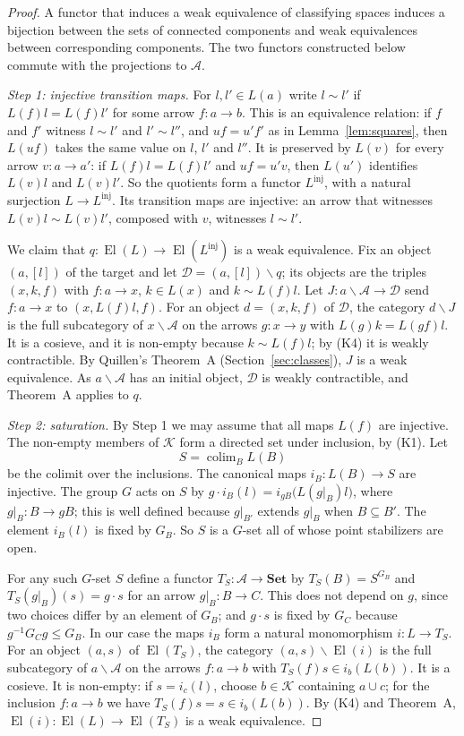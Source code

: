 \documentclass[11pt,a4paper]{article}
\theoremstyle{definition}
\newcommand{\El}{\operatorname{El}}
\newcommand{\colim}{\operatorname{colim}}
\newcommand{\Set}{\mathbf{Set}}
\newcommand{\K}{\mathcal{K}}
\begin{document}
\begin{proof}
A functor that induces a weak equivalence of classifying spaces induces a
bijection between the sets of connected components and weak equivalences
between corresponding components. The two functors constructed below commute
with the projections to $\mathcal A$.

\emph{Step 1: injective transition maps.} For $l,l'\in L(a)$ write $l\sim l'$
if $L(f)l=L(f)l'$ for some arrow $f\colon a\to b$. This is an equivalence
relation: if $f$ and $f'$ witness $l\sim l'$ and $l'\sim l''$, and $uf=u'f'$ as
in Lemma~\ref{lem:squares}, then $L(uf)$ takes the same value on $l$, $l'$ and
$l''$. It is preserved by $L(v)$ for every arrow $v\colon a\to a'$: if
$L(f)l=L(f)l'$ and $uf=u'v$, then $L(u')$ identifies $L(v)l$ and $L(v)l'$.
So the quotients form a functor $L^{\mathrm{inj}}$, with a natural surjection
$L\to L^{\mathrm{inj}}$. Its transition maps are injective: an arrow that
witnesses $L(v)l\sim L(v)l'$, composed with $v$, witnesses $l\sim l'$.

We claim that $q\colon\El(L)\to\El(L^{\mathrm{inj}})$ is a weak equivalence. Fix
an object $(a,[l])$ of the target and let $\mathcal D=(a,[l])\backslash q$; its
objects are the triples $(x,k,f)$ with $f\colon a\to x$, $k\in L(x)$ and
$k\sim L(f)l$. Let $J\colon a\backslash\mathcal A\to\mathcal D$ send
$f\colon a\to x$ to $(x,L(f)l,f)$. For an object $d=(x,k,f)$ of $\mathcal D$,
the category $d\backslash J$ is the full subcategory of $x\backslash\mathcal A$
on the arrows $g\colon x\to y$ with $L(g)k=L(gf)l$. It is a cosieve, and it is
non-empty because $k\sim L(f)l$; by (K4) it is weakly contractible. By
Quillen's Theorem~A (Section~\ref{sec:classes}), $J$ is a weak equivalence. As
$a\backslash\mathcal A$ has an initial object, $\mathcal D$ is weakly
contractible, and Theorem~A applies to $q$.

\emph{Step 2: saturation.} By Step 1 we may assume that all maps $L(f)$ are
injective. The non-empty members of $\K$ form a directed set under inclusion,
by (K1). Let
\[
 S=\colim_{B}L(B)
\]
be the colimit over the inclusions. The canonical maps $i_B\colon L(B)\to S$
are injective. The group $G$ acts on $S$ by
$g\cdot i_B(l)=i_{gB}\bigl(L(g|_B)l\bigr)$, where $g|_B\colon B\to gB$; this is
well defined because $g|_{B'}$ extends $g|_B$ when $B\subseteq B'$. The element
$i_B(l)$ is fixed by $G_B$. So $S$ is a $G$-set all of whose point stabilizers
are open.

For any such $G$-set $S$ define a functor $T_S\colon\mathcal A\to\Set$ by
$T_S(B)=S^{G_B}$ and $T_S(g|_B)(s)=g\cdot s$ for an arrow $g|_B\colon B\to C$.
This does not depend on $g$, since two choices differ by an element of $G_B$;
and $g\cdot s$ is fixed by $G_C$ because $g^{-1}G_Cg\le G_B$. In our case the
maps $i_B$ form a natural monomorphism $i\colon L\to T_S$. For an object
$(a,s)$ of $\El(T_S)$, the category $(a,s)\backslash\El(i)$ is the full
subcategory of $a\backslash\mathcal A$ on the arrows $f\colon a\to b$ with
$T_S(f)s\in i_b(L(b))$. It is a cosieve. It is non-empty: if $s=i_c(l)$,
choose $b\in\K$ containing $a\cup c$; for the inclusion $f\colon a\to b$ we
have $T_S(f)s=s\in i_b(L(b))$. By (K4) and Theorem~A,
$\El(i)\colon\El(L)\to\El(T_S)$ is a weak equivalence.


\end{proof}
\end{document}
